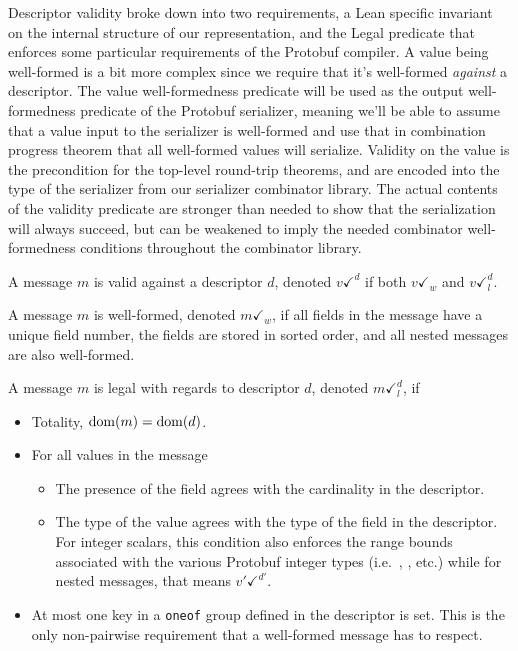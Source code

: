 Descriptor validity broke down into two requirements, a Lean specific invariant
on the internal structure of our representation, and the Legal predicate that
enforces some particular requirements of the Protobuf compiler. A value being
well-formed is a bit more complex since we require that it's well-formed
\emph{against} a descriptor. The value well-formedness predicate will be used as
the output well-formedness predicate of the Protobuf serializer, meaning we'll
be able to assume that a value input to the serializer is well-formed and
use that in combination progress theorem that all well-formed values will
serialize. Validity on the value is the precondition for the top-level
round-trip theorems, and are encoded into the type of the serializer from our
serializer combinator library. The actual contents of the validity predicate are
stronger than needed to show that the serialization will always succeed, but can
be weakened to imply the needed combinator well-formedness conditions throughout the
combinator library.

\vspace{1em}
\begin{definition}\label{def:vvalid}
  A message $m$ is valid against a descriptor $d$, denoted $v \checkmark^d$ if
  both $v \checkmark_w$ and $v \checkmark_l^d$. 
\end{definition}

\vspace{1em}
\begin{definition}\label{def:vwf}
  A message $m$ is well-formed, denoted $m \checkmark_w$, if all fields in
  the message have a unique field number, the fields are stored in sorted
  order, and all nested messages are also well-formed.
\end{definition}

\vspace{1em}
\begin{definition}\label{def:vlegal}
  A message $m$ is legal with regards to descriptor $d$, denoted $m
  \checkmark_l^d$, if
  \begin{itemize}
  \item Totality, $\mathrm{dom}(m) = \mathrm{dom}(d)$.
  \item For all values in the message
    \begin{itemize}
    \item The presence of the field agrees with the cardinality in the
      descriptor.
    \item The type of the value agrees with the type of the field in the
      descriptor. For integer scalars, this condition also enforces the range
      bounds associated with the various Protobuf integer types (i.e.\ \ints{},
      \uintl{}, etc.) while for nested messages, that means $v' \checkmark^{d'}$.
    \end{itemize}
  \item At most one key in a \texttt{oneof} group defined in the descriptor is
    set. This is the only non-pairwise requirement that a well-formed message has
    to respect.
  \end{itemize}
\end{definition}

